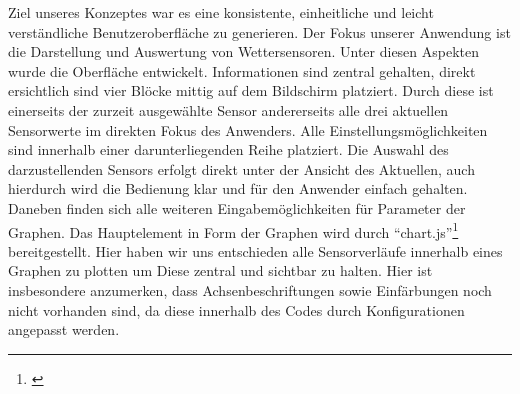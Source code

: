 Ziel unseres Konzeptes war es eine konsistente, einheitliche und leicht verständliche Benutzeroberfläche zu generieren.
Der Fokus unserer Anwendung ist die Darstellung und Auswertung von Wettersensoren. Unter diesen Aspekten wurde die Oberfläche entwickelt.
Informationen sind zentral gehalten, direkt ersichtlich sind vier Blöcke mittig auf dem Bildschirm platziert.
Durch diese ist einerseits der zurzeit ausgewählte Sensor andererseits alle drei aktuellen Sensorwerte im direkten Fokus des Anwenders.
Alle Einstellungsmöglichkeiten sind innerhalb einer darunterliegenden Reihe platziert.
Die Auswahl des darzustellenden Sensors erfolgt direkt unter der Ansicht des Aktuellen, auch hierdurch wird die Bedienung klar und für den Anwender einfach gehalten.
Daneben finden sich alle weiteren Eingabemöglichkeiten für Parameter der Graphen.
Das Hauptelement in Form der Graphen wird durch \enquote{chart.js}\footnote{\cite{chartjs.2020}} bereitgestellt.
Hier haben wir uns entschieden alle Sensorverläufe innerhalb eines Graphen zu plotten um Diese zentral und sichtbar zu halten.
Hier ist insbesondere anzumerken, dass Achsenbeschriftungen sowie Einfärbungen noch nicht vorhanden sind, da diese innerhalb des Codes durch Konfigurationen angepasst werden.


